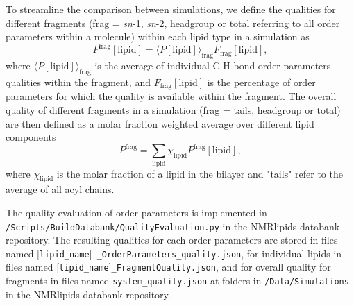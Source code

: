 \documentclass[fleqn,10pt]{wlscirep}
\begin{document}
To streamline the comparison between simulations, we define the qualities for different fragments (frag = \textit{sn}-1, \textit{sn}-2, headgroup or total referring to all order parameters within a molecule) within each lipid type in a simulation as
\begin{equation}
    P^\mathrm{frag}[\mathrm{lipid}] = \langle P[\mathrm{lipid}]\rangle_\mathrm{frag} F_\mathrm{frag}[\mathrm{lipid}],
\end{equation}
where $\langle P[\mathrm{lipid}]\rangle_\mathrm{frag}$ is the average of individual C-H bond order parameters qualities within the fragment, and $F_\mathrm{frag}[\mathrm{lipid}]$ is the percentage of order parameters for which the quality is available within the fragment.
The overall quality of different fragments in a simulation (frag = tails, headgroup or total) are then defined as a molar fraction weighted average over different lipid components
\begin{equation}
    P^\mathrm{frag} = \sum_\mathrm{lipid} \chi_\mathrm{lipid} P^\mathrm{frag}[\mathrm{lipid}],
\end{equation}
where $\chi_\mathrm{lipid}$ is the molar fraction of a lipid in the bilayer and "tails" refer to the average of all acyl chains.

The quality evaluation of order parameters is implemented in \texttt{/Scripts/BuildDatabank/QualityEvaluation.py} in the NMRlipids databank repository. The resulting qualities for each order parameters are stored in files named  [\texttt{lipid\_name}]\texttt{ \_OrderParameters\_quality.json}, for individual lipids in files named [\texttt{lipid\_name}]\texttt{\_FragmentQuality.json}, and for overall quality for fragments in files named \texttt{system\_quality.json} at folders in \texttt{/Data/Simulations} in the NMRlipids databank repository. 
\end{document}
